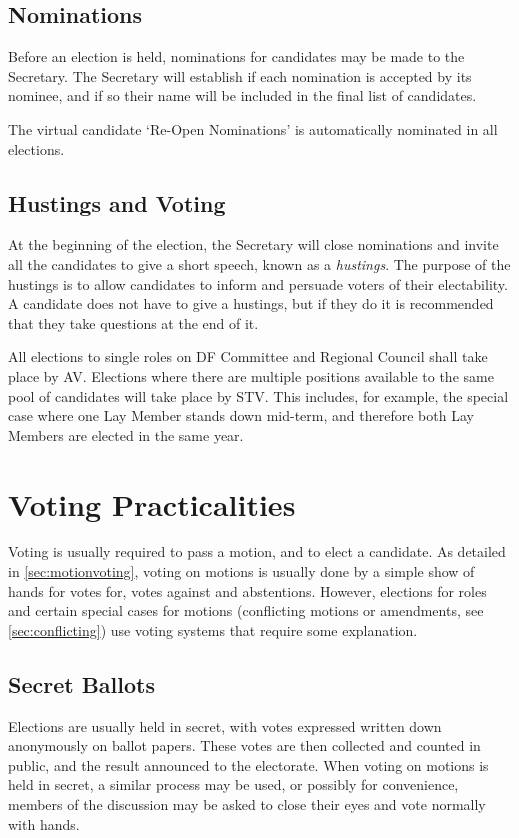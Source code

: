\documentclass[a4paper, 11pt]{article} %
\begin{document}
\subsection{Nominations}
Before an election is held, nominations for candidates may be made to the Secretary.  The Secretary will establish if each nomination is accepted by its nominee, and if so their name will be included in the final list of candidates.

The virtual candidate `Re-Open Nominations' is automatically nominated in all elections.

\subsection{Hustings and Voting}
At the beginning of the election, the Secretary will close nominations and invite all the candidates to give a short speech, known as a \emph{hustings}.  The purpose of the hustings is to allow candidates to inform and persuade voters of their electability.  A candidate does not have to give a hustings, but if they do it is recommended that they take questions at the end of it.

All elections to single roles on DF Committee and Regional Council shall take place by AV.  Elections where there are multiple positions available to the same pool of candidates will take place by STV.  This includes, for example, the special case where one Lay Member stands down mid-term, and therefore both Lay Members are elected in the same year.

\section{Voting Practicalities}
Voting is usually required to pass a motion, and to elect a candidate.  As detailed in \autoref{sec:motionvoting}, voting on motions is usually done by a simple show of hands for votes for, votes against and abstentions.  However, elections for roles and certain special cases for motions (conflicting motions or amendments, see \autoref{sec:conflicting}) use voting systems that require some explanation.

\subsection{Secret Ballots}
Elections are usually held in secret, with votes expressed written down anonymously on ballot papers.  These votes are then collected and counted in public, and the result announced to the electorate.  When voting on motions is held in secret, a similar process may be used, or possibly for convenience, members of the discussion may be asked to close their eyes and vote normally with hands.
\end{document}
